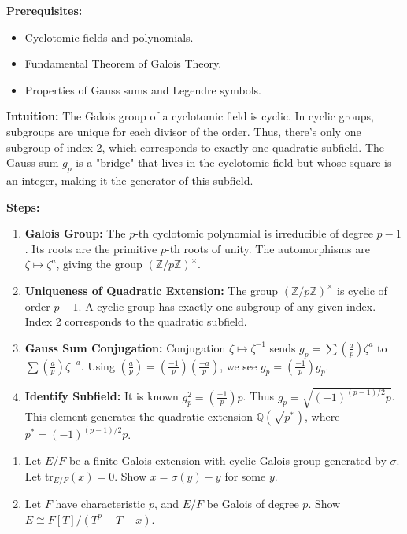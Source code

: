 \begin{solution}
\textbf{Prerequisites:}
\begin{itemize}
    \item Cyclotomic fields and polynomials.
    \item Fundamental Theorem of Galois Theory.
    \item Properties of Gauss sums and Legendre symbols.
\end{itemize}

\textbf{Intuition:}
The Galois group of a cyclotomic field is cyclic. In cyclic groups, subgroups are unique for each divisor of the order. Thus, there's only one subgroup of index 2, which corresponds to exactly one quadratic subfield. The Gauss sum $g_p$ is a "bridge" that lives in the cyclotomic field but whose square is an integer, making it the generator of this subfield.

\par

\textbf{Steps:}
\begin{enumerate}
    \item \textbf{Galois Group:} The $p$-th cyclotomic polynomial is irreducible of degree $p-1$. Its roots are the primitive $p$-th roots of unity. The automorphisms are $\zeta \mapsto \zeta^a$, giving the group $(\mathbb{Z}/p\mathbb{Z})^\times$.

    \item \textbf{Uniqueness of Quadratic Extension:} The group $(\mathbb{Z}/p\mathbb{Z})^\times$ is cyclic of order $p-1$. A cyclic group has exactly one subgroup of any given index. Index 2 corresponds to the quadratic subfield.

    \item \textbf{Gauss Sum Conjugation:} Conjugation $\zeta \mapsto \zeta^{-1}$ sends $g_p = \sum \left(\frac{a}{p}\right) \zeta^a$ to $\sum \left(\frac{a}{p}\right) \zeta^{-a}$. Using $\left(\frac{a}{p}\right) = \left(\frac{-1}{p}\right) \left(\frac{-a}{p}\right)$, we see $\overline{g_p} = \left(\frac{-1}{p}\right) g_p$.

    \item \textbf{Identify Subfield:} It is known $g_p^2 = \left(\frac{-1}{p}\right) p$. Thus $g_p = \sqrt{(-1)^{(p-1)/2} p}$. This element generates the quadratic extension $\mathbb{Q}(\sqrt{p^*})$, where $p^* = (-1)^{(p-1)/2} p$.
\end{enumerate}
\end{solution}

\begin{exercise}
\label{algebra:2019:10}
\begin{enumerate}
    \item Let $E/F$ be a finite Galois extension with cyclic Galois group generated by $\sigma$. Let $\mathrm{tr}_{E/F}(x) = 0$. Show $x = \sigma(y) - y$ for some $y$.
    \item Let $F$ have characteristic $p$, and $E/F$ be Galois of degree $p$. Show $E \cong F[T]/(T^p - T - x)$.
\end{enumerate}
\end{exercise}

